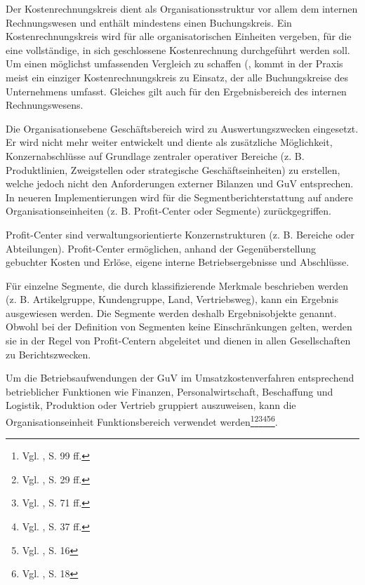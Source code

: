 Der Kostenrechnungskreis dient als Organisationsstruktur vor allem dem internen Rechnungswesen und enthält mindestens einen Buchungskreis. Ein Kostenrechnungskreis wird für alle organisatorischen Einheiten vergeben, für die eine vollständige, in sich geschlossene Kostenrechnung durchgeführt werden soll. Um einen möglichst umfassenden Vergleich zu schaffen (, kommt in der Praxis meist ein einziger Kostenrechnungskreis zu Einsatz, der alle Buchungskreise des Unternehmens umfasst. Gleiches gilt auch für den Ergebnisbereich des internen Rechnungswesens.

Die Organisationsebene Geschäftsbereich wird zu Auswertungszwecken eingesetzt. Er wird nicht mehr weiter entwickelt und diente als zusätzliche Möglichkeit, Konzernabschlüsse auf Grundlage zentraler operativer Bereiche (z. B. Produktlinien, Zweigstellen oder strategische Geschäftseinheiten) zu erstellen, welche jedoch nicht den Anforderungen externer Bilanzen und GuV entsprechen. In neueren Implementierungen wird für die Segmentberichterstattung auf andere Organisationseinheiten (z. B. Profit-Center oder Segmente) zurückgegriffen.

Profit-Center sind verwaltungsorientierte Konzernstrukturen (z. B. Bereiche oder Abteilungen). Profit-Center ermöglichen, anhand der Gegenüberstellung gebuchter Kosten und Erlöse, eigene interne Betriebsergebnisse und Abschlüsse.

Für einzelne Segmente, die durch klassifizierende Merkmale beschrieben werden (z. B. Artikelgruppe, Kundengruppe, Land, Vertriebsweg), kann ein Ergebnis ausgewiesen werden. Die Segmente werden deshalb Ergebnisobjekte genannt. Obwohl bei der Definition von Segmenten keine Einschränkungen gelten, werden sie in der Regel von Profit-Centern abgeleitet und dienen in allen Gesellschaften zu Berichtszwecken. 

Um die Betriebsaufwendungen der GuV im Umsatzkostenverfahren entsprechend betrieblicher Funktionen wie Finanzen, Personalwirtschaft, Beschaffung und Logistik, Produktion oder Vertrieb gruppiert auszuweisen, kann die Organisationseinheit Funktionsbereich verwendet werden\footnote{Vgl. \cite{Hefner2001}, S. 99 ff.}\footnote{Vgl. \cite{Friedl2008}, S. 29 ff.}\footnote{Vgl. \cite{Maassen2006}, S. 71 ff.}\footnote{Vgl. \cite{Patel2009}, S. 37 ff.}\footnote{Vgl. \cite{Padhi2011}, S. 16}\footnote{Vgl. \cite{SAPFI2001}, S. 18}.

